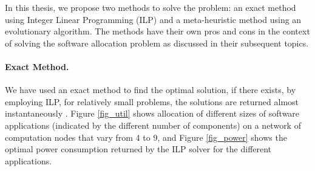 
In this thesis, we propose two methods to solve the problem: an exact method using Integer Linear Programming (ILP) and a meta-heuristic method using an evolutionary algorithm. The methods have their own pros and cons in the context of solving the software allocation problem as discussed in their subsequent topics.

\paragraph{Exact Method. } We have used an exact method to find the optimal solution, if there exists, by employing ILP, for relatively small problems, the solutions are returned almost instantaneously \cite{Mahmud5222}. Figure \ref{fig_util} shows allocation of different sizes of software applications (indicated by the different number of components) on a network of computation nodes that vary from 4 to 9, and Figure \ref{fig_power} shows the optimal power consumption returned by the ILP solver for the different applications.
